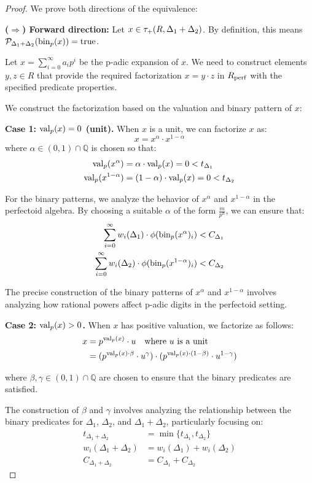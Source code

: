 \begin{proof}
We prove both directions of the equivalence:

\textbf{($\Rightarrow$) Forward direction:} Let $x \in \tau_+(R,\Delta_1+\Delta_2)$. By definition, this means $\mathcal{P}_{\Delta_1+\Delta_2}(\operatorname{bin}_p(x)) = \text{true}$.

Let $x = \sum_{i=0}^{\infty} a_i p^i$ be the p-adic expansion of $x$. We need to construct elements $y, z \in R$ that provide the required factorization $x = y \cdot z$ in $R_{\operatorname{perf}}$ with the specified predicate properties.

We construct the factorization based on the valuation and binary pattern of $x$:

\textbf{Case 1: $\operatorname{val}_p(x) = 0$ (unit).} When $x$ is a unit, we can factorize $x$ as:
$$x = x^{\alpha} \cdot x^{1-\alpha}$$
where $\alpha \in (0,1) \cap \mathbb{Q}$ is chosen so that:
\begin{align*}
\operatorname{val}_p(x^{\alpha}) &= \alpha \cdot \operatorname{val}_p(x) = 0 < t_{\Delta_1} \\
\operatorname{val}_p(x^{1-\alpha}) &= (1-\alpha) \cdot \operatorname{val}_p(x) = 0 < t_{\Delta_2}
\end{align*}

For the binary patterns, we analyze the behavior of $x^{\alpha}$ and $x^{1-\alpha}$ in the perfectoid algebra. By choosing a suitable $\alpha$ of the form $\frac{m}{p^n}$, we can ensure that:
\begin{align*}
\sum_{i=0}^{\infty} w_i(\Delta_1) \cdot \phi(\operatorname{bin}_p(x^{\alpha})_i) &< C_{\Delta_1} \\
\sum_{i=0}^{\infty} w_i(\Delta_2) \cdot \phi(\operatorname{bin}_p(x^{1-\alpha})_i) &< C_{\Delta_2}
\end{align*}

The precise construction of the binary patterns of $x^{\alpha}$ and $x^{1-\alpha}$ involves analyzing how rational powers affect p-adic digits in the perfectoid setting.

\textbf{Case 2: $\operatorname{val}_p(x) > 0$.} When $x$ has positive valuation, we factorize as follows:
\begin{align*}
x &= p^{\operatorname{val}_p(x)} \cdot u \quad \text{where $u$ is a unit}\\
&= (p^{\operatorname{val}_p(x) \cdot \beta} \cdot u^{\gamma}) \cdot (p^{\operatorname{val}_p(x) \cdot (1-\beta)} \cdot u^{1-\gamma})
\end{align*}

where $\beta, \gamma \in (0,1) \cap \mathbb{Q}$ are chosen to ensure that the binary predicates are satisfied.

The construction of $\beta$ and $\gamma$ involves analyzing the relationship between the binary predicates for $\Delta_1$, $\Delta_2$, and $\Delta_1+\Delta_2$, particularly focusing on:
\begin{align*}
t_{\Delta_1+\Delta_2} &= \min\{t_{\Delta_1}, t_{\Delta_2}\} \\
w_i(\Delta_1+\Delta_2) &= w_i(\Delta_1) + w_i(\Delta_2) \\
C_{\Delta_1+\Delta_2} &= C_{\Delta_1} + C_{\Delta_2}
\end{align*}


\end{proof}
